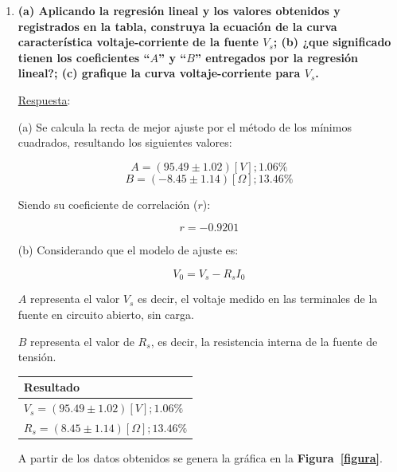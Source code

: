 \documentclass[letter,11pt]{article}
\begin{document}
\begin{enumerate}
\item \textbf{(a) Aplicando la regresión lineal y los valores obtenidos y
registrados en la tabla, construya la ecuación de la curva característica
voltaje-corriente de la fuente $V_s$; (b) ¿que significado tienen los
coeficientes ``$A$'' y ``$B$'' entregados por la regresión lineal?; (c) grafique
la curva voltaje-corriente para $V_s$.}

\underline{Respuesta}:

(a) Se calcula la recta de mejor ajuste por el método de los mínimos cuadrados,
resultando los siguientes valores:

\begin{equation*}
    A = (95.49 \pm 1.02) [V]; 1.06\%
\end{equation*}
\begin{equation*}
    B = (-8.45 \pm 1.14) [\Omega]; 13.46\%
\end{equation*}

Siendo su coeficiente de correlación ($r$):

\begin{equation*}
    r = -0.9201
\end{equation*}

(b) Considerando que el modelo de ajuste es:

\begin{equation*}
    V_0 = V_s - R_s I_0
\end{equation*}

$A$ representa el valor $V_s$ es decir, el voltaje medido en las terminales de
la fuente en circuito abierto, sin carga.

$B$ representa el valor de $R_s$, es decir, la resistencia interna de la fuente
de tensión.

\begin{center}
\begin{tabular}{|>{\centering}m{9.2cm}<{\centering}|}
\hline
\textbf{Resultado}
\tabularnewline \hline
$V_s = (95.49 \pm 1.02) [V]; 1.06\%$ \tabularnewline
$R_s = (8.45 \pm 1.14) [\Omega]; 13.46\%$ \tabularnewline
\hline
\end{tabular}
\end{center}
\vspace{0.10cm}

A partir de los datos obtenidos se genera la gráfica en la
\textbf{Figura~\ref{figura}}.


\end{enumerate}
\end{document}
